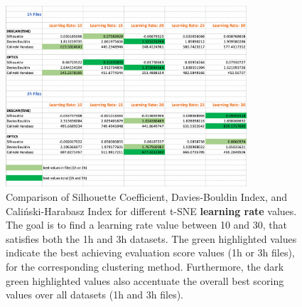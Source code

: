 \begin{figure}
  \centering
  \includegraphics[width=0.8\textwidth]{./images/tsneParametersTest/learningRate/learningRateEvaluationScoresDetailed3.png}
  \caption{Comparison of Silhouette Coefficient, Davies-Bouldin Index, and Caliński-Harabasz Index for different t-SNE \textbf{learning rate} values. The goal is to find a learning rate value between 10
  and 30, that satisfies both the 1h and 3h datasets. The green highlighted values indicate the best achieving evaluation score values (1h or 3h files), for the corresponding clustering method. Furthermore, the dark green highlighted values also accentuate the overall best scoring values over all datasets (1h and 3h files).}
  \label{figure:learningRateEvaluationScoresDetailed3}
\end{figure}



